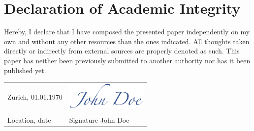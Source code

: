 \section*{Declaration of Academic Integrity}
\label{sec:authenticity_agreement}

Hereby, I declare that I have composed the presented paper independently on my own and without any other resources than the ones indicated. All thoughts taken directly or indirectly from external sources are properly denoted as such. This paper has neither been previously submitted to another authority nor has it been published yet.

\vspace{1cm}

\noindent\begin{tabular}{@{}ll}
	Zurich, 01.01.1970 & \includegraphics[width=4cm]{Resources/Images/AuthenticityAgreement/signature} \\[-1.5ex]
	\makebox[6cm]{\hrulefill} & \makebox[6cm]{\hrulefill}\\ 
	Location, date & Signature John Doe\\
\end{tabular}
